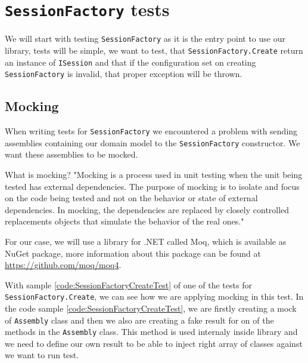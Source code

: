 \section{\texttt{SessionFactory} tests}

We will start with testing \texttt{SessionFactory} as it is the entry point to use our library, tests will be simple,
we want to test, that \texttt{SessionFactory.Create} return an instance of \texttt{ISession} and that if the configuration
set on creating \texttt{SessionFactory} is invalid, that proper exception will be thrown.

\subsection{Mocking}

When writing tests for \texttt{SessionFactory} we encountered a problem with sending assemblies containing our domain model to the \texttt{SessionFactory}
constructor. We want these assemblies to be mocked.

What is mocking? "Mocking is a process used in unit testing when the unit being tested has external dependencies.
The purpose of mocking is to isolate and focus on the code being tested and not on the behavior or state of external dependencies.
In mocking, the dependencies are replaced by closely controlled replacements
objects that simulate the behavior of the real ones." \cite{noauthor_mocking_nodate}

For our case, we will use a library for .NET called Moq, which is available as NuGet package, more information about this package can
be found at \url{https://github.com/moq/moq4}.

With sample \ref{code:SessionFactoryCreateTest} of one of the tests for \texttt{SessionFactory.Create}, we can see how we are applying mocking in this test.
In the code sample \ref{code:SessionFactoryCreateTest}, we are firstly creating a mock of \texttt{Assembly} class and then we also are creating a fake result for
on of the methods in the \texttt{Assembly} class. This method is used internaly inside library and we need to define our own result to be able to inject right
array of classes against we want to run test.


